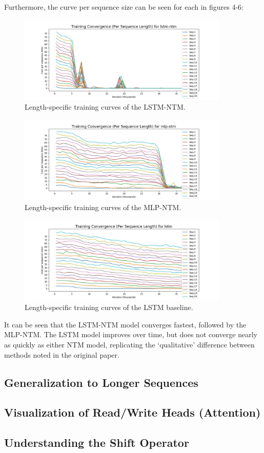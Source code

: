 \documentclass{amsart}
\theoremstyle{definition}
\theoremstyle{remark}
\numberwithin{equation}{section}
\begin{document}
Furthermore, the curve per sequence size can be seen for each in figures 4-6:\\

\begin{figure}[h]
\includegraphics[width=100mm]{outputs/lstm-ntm_convergence-perlen}
\caption{Length-specific training curves of the LSTM-NTM.}
\label{Figure 4}
\end{figure}

\begin{figure}[h]
\includegraphics[width=100mm]{outputs/mlp-ntm_convergence-perlen}
\caption{Length-specific training curves of the MLP-NTM.}
\label{Figure 5}
\end{figure}

\begin{figure}[h]
\includegraphics[width=100mm]{outputs/lstm_convergence-perlen}
\caption{Length-specific training curves of the LSTM baseline.}
\label{Figure 6}
\end{figure}

It can be seen that the LSTM-NTM model converges fastest, followed by the
MLP-NTM. The LSTM model improves over time, but does not converge nearly as
quickly as either NTM model, replicating the `qualitative' difference between
methods noted in the original paper. \\

\subsection{Generalization to Longer Sequences}



\subsection{Visualization of Read/Write Heads (Attention)}
\subsection{Understanding the Shift Operator}
\end{document}
